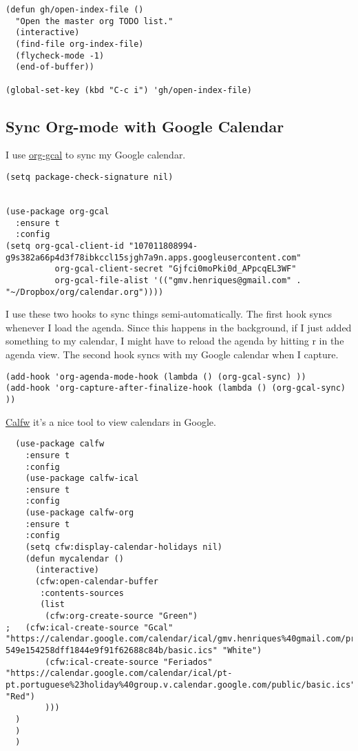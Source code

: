 \documentclass[11pt]{article}
\begin{document}
\begin{verbatim}
(defun gh/open-index-file ()
  "Open the master org TODO list."
  (interactive)
  (find-file org-index-file)
  (flycheck-mode -1)
  (end-of-buffer))

(global-set-key (kbd "C-c i") 'gh/open-index-file)
\end{verbatim}

\subsection{Sync Org-mode with Google Calendar}
\label{sec:orga81a25d}

I use \href{https://github.com/myuhe/org-gcal.el}{org-gcal} to sync my Google calendar.

\begin{verbatim}
(setq package-check-signature nil)


(use-package org-gcal
  :ensure t
  :config
(setq org-gcal-client-id "107011808994-g9s382a66p4d3f78ibkccl15sjgh7a9n.apps.googleusercontent.com"
          org-gcal-client-secret "Gjfci0moPki0d_APpcqEL3WF"
          org-gcal-file-alist '(("gmv.henriques@gmail.com" .  "~/Dropbox/org/calendar.org"))))

\end{verbatim}

I use these two hooks to sync things semi-automatically.
The first hook syncs whenever I load the agenda. Since this happens in the background, if I just added something to my calendar, I might have to reload the agenda by hitting r in the agenda view.
The second hook syncs with my Google calendar when I capture.

\begin{verbatim}
(add-hook 'org-agenda-mode-hook (lambda () (org-gcal-sync) ))
(add-hook 'org-capture-after-finalize-hook (lambda () (org-gcal-sync) ))
\end{verbatim}

\href{https://github.com/kiwanami/emacs-calfw}{Calfw} it's a nice tool to view calendars in Google.

\begin{verbatim}
  (use-package calfw
    :ensure t
    :config
    (use-package calfw-ical
    :ensure t
    :config
    (use-package calfw-org
    :ensure t
    :config
    (setq cfw:display-calendar-holidays nil)
    (defun mycalendar ()
      (interactive)
      (cfw:open-calendar-buffer
       :contents-sources
       (list
        (cfw:org-create-source "Green")
;	(cfw:ical-create-source "Gcal" "https://calendar.google.com/calendar/ical/gmv.henriques%40gmail.com/private-549e154258dff1844e9f91f62688c84b/basic.ics" "White")
        (cfw:ical-create-source "Feriados" "https://calendar.google.com/calendar/ical/pt-pt.portuguese%23holiday%40group.v.calendar.google.com/public/basic.ics" "Red")
        )))
  )
  )
  )
\end{verbatim}
\end{document}
